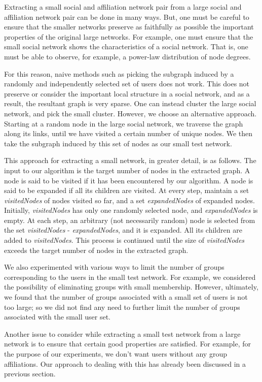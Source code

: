 \documentclass{report}
\begin{document}
Extracting a small social and affiliation network pair from a large social and affiliation network pair can be done in many ways. But, one must be careful to ensure that the smaller networks preserve as faithfully as possible the important properties of the original large networks. For example, one must ensure that the small social network shows the characteristics of a social network. That is, one must be able to observe, for example, a power-law distribution of node degrees.

For this reason, naive methods such as picking the subgraph induced by a randomly and independently selected set of users does not work. This does not preserve or consider the important local structure in a social network, and as a result, the resultant graph is very sparse. One can instead cluster the large social network, and pick the small cluster. However, we choose an alternative approach. Starting at a random node in the large social network, we traverse the graph along its links, until we have visited a certain number of unique nodes. We then take the subgraph induced by this set of nodes as our small test network.

This approach for extracting a small network, in greater detail, is as follows. The input to our algorithm is the target number of nodes in the extracted graph. A node is said to be visited if it has been encountered by our algorithm. A node is said to be expanded if all its children are visited. At every step, maintain a set \textit{visitedNodes} of nodes visited so far, and a set \textit{expandedNodes} of expanded nodes. Initially, \textit{visitedNodes} has only one randomly selected node, and \textit{expandedNodes} is empty. At each step, an arbitrary (not necessarily random) node is selected from the set \textit{visitedNodes} - \textit{expandedNodes}, and it is expanded. All its children are added to \textit{visitedNodes}. This process is continued until the size of \textit{visitedNodes} exceeds the target number of nodes in the extracted graph.

We also experimented with various ways to limit the number of groups corresponding to the users in the small test network. For example, we considered the possibility of eliminating groups with small membership. However, ultimately, we found that the number of groups associated with a small set of users is not too large; so we did not find any need to further limit the number of groups associated with the small user set.

Another issue to consider while extracting a small test network from a large network is to ensure that certain good properties are satisfied. For example, for the purpose of our experiments, we don't want users without any group affiliations. Our approach to dealing with this has already been discussed in a previous section.
\end{document}
